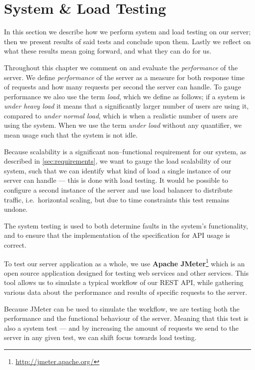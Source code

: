 \section{System \& Load Testing}\label{cha:system_and_load_testing}
In this section we describe how we perform system and load testing on our server;
then we present results of said tests and conclude upon them.
Lastly we reflect on what these results mean going forward, and what they can do for us.

Throughout this chapter we comment on and evaluate the \textit{performance} of the server.
We define \textit{performance} of the server as a measure for both response time of requests and how many requests per second the server can handle.
To gauge performance we also use the term \textit{load}, which we define as follows;
if a system is \textit{under heavy load} it means that a significantly larger number of users are using it, compared to \textit{under normal load}, which is when a realistic number of users are using the system.
When we use the term \textit{under load} without any quantifier, we mean usage such that the system is not idle.

\bigskip
Because scalability is a significant non--functional requirement for our system, as described in \cref{sec:requirements}, we want to gauge the load scalability of our system, such that we can identify what kind of load a single instance of our server can handle --- this is done with load testing. %
It would be possible to configure a second instance of the server and use load balancer to distribute traffic, i.e.~horizontal scaling, but due to time constraints this test remains undone.

The system testing is used to both determine faults in the system's functionality, and to ensure that the implementation of the specification for API usage is correct.

\bigskip
To test our server application as a whole, we use \textbf{Apache JMeter}\footnote{\url{http://jmeter.apache.org/}} which is an open source application designed for testing web services and other services.
This tool allows us to simulate a typical workflow of our REST API, while gathering various data about the performance and results of specific requests to the server.

Because JMeter can be used to simulate the workflow, we are testing both the performance and the functional behaviour of the server.
Meaning that this test is also a system test --- and by increasing the amount of requests we send to the server in any given test, we can shift focus towards load testing.

